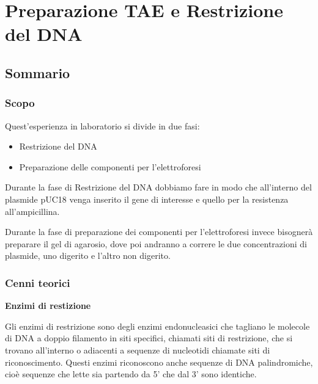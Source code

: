 \chapter{Preparazione TAE e Restrizione del DNA}

\vspace{0.6cm}


\section{Sommario}

\subsection{Scopo}

Quest'esperienza in laboratorio si divide in due fasi:

\begin{itemize}

	\item Restrizione del DNA

	\item Preparazione delle componenti per l'elettroforesi

\end{itemize}

Durante la fase di Restrizione del DNA dobbiamo fare in modo che all'interno del
plasmide pUC18 venga inserito il gene di interesse e quello per la resistenza all'ampicillina.
\vspace{0.3cm}

Durante la fase di preparazione dei componenti per l'elettroforesi invece bisognerà preparare il gel di
agarosio, dove poi andranno a correre le due concentrazioni di plasmide, uno digerito e l'altro non digerito.

\subsection{Cenni teorici}

\textbf{Enzimi di restizione}
\vspace{0.3cm}



Gli enzimi di restrizione sono degli enzimi endonucleasici che tagliano le molecole
di DNA a doppio filamento in siti specifici, chiamati siti di restrizione,
che si trovano all'interno o adiacenti a sequenze di nucleotidi chiamate siti di riconoscimento.
Questi enzimi riconoscono anche sequenze di DNA palindromiche, cioè sequenze che lette sia
partendo da 5' che dal 3' sono identiche.


